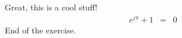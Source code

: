 \documentclass{article}
\begin{document}
Great, this is a cool stuff!
\begin{eqnarray}
  \label{eqn:simple}
  e^{j\pi} + 1 &=& 0
\end{eqnarray}
End of the exercise.
\end{document}
